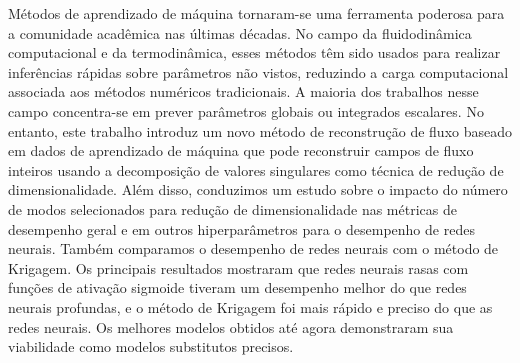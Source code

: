 


Métodos de aprendizado de máquina tornaram-se uma ferramenta poderosa para a comunidade acadêmica nas últimas décadas. No campo da fluidodinâmica computacional e da termodinâmica, esses métodos têm sido usados para realizar inferências rápidas sobre parâmetros não vistos, reduzindo a carga computacional associada aos métodos numéricos tradicionais. A maioria dos trabalhos nesse campo concentra-se em prever parâmetros globais ou integrados escalares. No entanto, este trabalho introduz um novo método de reconstrução de fluxo baseado em dados de aprendizado de máquina que pode reconstruir campos de fluxo inteiros usando a decomposição de valores singulares como técnica de redução de dimensionalidade. Além disso, conduzimos um estudo sobre o impacto do número de modos selecionados para redução de dimensionalidade nas métricas de desempenho geral e em outros hiperparâmetros para o desempenho de redes neurais. Também comparamos o desempenho de redes neurais com o método de Krigagem. Os principais resultados mostraram que redes neurais rasas com funções de ativação sigmoide tiveram um desempenho melhor do que redes neurais profundas, e o método de Krigagem foi mais rápido e preciso do que as redes neurais. Os melhores modelos obtidos até agora demonstraram sua viabilidade como modelos substitutos precisos.


